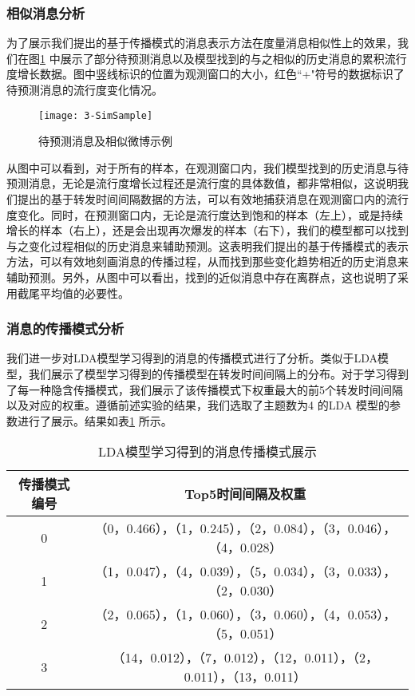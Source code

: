 \subsubsection{相似消息分析}
为了展示我们提出的基于传播模式的消息表示方法在度量消息相似性上的效果，我们在图\ref{fig:simExample} 中展示了部分待预测消息以及模型找到的与之相似的历史消息的累积流行度增长数据。图中竖线标识的位置为观测窗口的大小，红色``+"符号的数据标识了待预测消息的流行度变化情况。
\begin{figure}[!htbp]
  \centering
  \texttt{[image: 3-SimSample]}
  \caption{待预测消息及相似微博示例}
  \label{fig:simExample}
\end{figure}

从图中可以看到，对于所有的样本，在观测窗口内，我们模型找到的历史消息与待预测消息，无论是流行度增长过程还是流行度的具体数值，都非常相似，这说明我们提出的基于转发时间间隔数据的方法，可以有效地捕获消息在观测窗口内的流行度变化。同时，在预测窗口内，无论是流行度达到饱和的样本（左上），或是持续增长的样本（右上），还是会出现再次爆发的样本（右下），我们的模型都可以找到与之变化过程相似的历史消息来辅助预测。这表明我们提出的基于传播模式的表示方法，可以有效地刻画消息的传播过程，从而找到那些变化趋势相近的历史消息来辅助预测。另外，从图中可以看出，找到的近似消息中存在离群点，这也说明了采用截尾平均值的必要性。

\subsubsection{消息的传播模式分析}
我们进一步对LDA模型学习得到的消息的传播模式进行了分析。类似于LDA模型，我们展示了模型学习得到的传播模型在转发时间间隔上的分布。对于学习得到了每一种隐含传播模式，我们展示了该传播模式下权重最大的前5个转发时间间隔以及对应的权重。遵循前述实验的结果，我们选取了主题数为4 的LDA 模型的参数进行了展示。结果如表\ref{tab:ldaTopics} 所示。
\begin{table}[!htb]
    \centering
    \footnotesize%
    \setlength{\tabcolsep}{4pt}%
    \renewcommand{\arraystretch}{1.2}%
    \begin{tabular}{c|c}
        \hline
        传播模式编号 & Top5时间间隔及权重 \\
        \hline
        0 & （0，0.466），（1，0.245），（2，0.084），（3，0.046），（4，0.028） \\
        \hline
        1 & （1，0.047），（4，0.039），（5，0.034），（3，0.033），（2，0.030） \\
        \hline
        2 & （2，0.065），（1，0.060），（3，0.060），（4，0.053），（5，0.051） \\
        \hline
        3 & （14，0.012），（7，0.012），（12，0.011），（2，0.011），（13，0.011） \\
        \hline
    \end{tabular}
    \caption{LDA模型学习得到的消息传播模式展示}
    \label{tab:ldaTopics}
\end{table}

